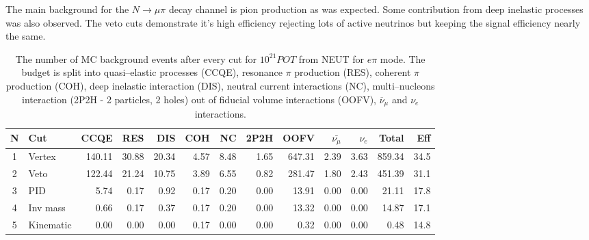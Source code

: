 \documentclass[../main.tex]{subfiles}
\begin{document}
The main background for the $N\to\mu\pi$ decay channel is pion production as was expected. Some contribution from deep inelastic processes was also observed. The veto cuts demonstrate it's high efficiency rejecting lots of active neutrinos but keeping the signal efficiency nearly the same.


\begin{table}[!ht]
\begin{tabular}{|c|l|r|r|r|r|r|r|r|r|r|r|r|}
  \hline
  N & Cut           &  CCQE   &  RES  &  DIS  &  COH  &  NC  &  2P2H  &  OOFV  &$\bar{\nu_{\mu}}$& $\nu_{e}$ & Total  & Eff\\
  \hline
  1 & Vertex        & 140.11  & 30.88 & 20.34 & 4.57  & 8.48 & 1.65   & 647.31 & 2.39            &  3.63     & 859.34 & 34.5 \\
  \hline
  2 & Veto          & 122.44  & 21.24 & 10.75 & 3.89  & 6.55 & 0.82   & 281.47 & 1.80            &  2.43     & 451.39 & 31.1 \\
  \hline
  3 & PID          & 5.74    & 0.17  & 0.92  & 0.17  & 0.20 & 0.00   & 13.91  & 0.00            &  0.00     &  21.11 & 17.8 \\
  \hline
  4 & Inv mass      & 0.66    & 0.17  & 0.37  & 0.17  & 0.20 & 0.00   & 13.32  & 0.00            &  0.00     &  14.87 & 17.1  \\
  \hline
  5 & Kinematic     & 0.00    & 0.00  & 0.00  & 0.17  & 0.00 & 0.00   & 0.32   & 0.00            &  0.00     &  0.48  & 14.8 \\
    \hline

\end{tabular}
\caption{The number of MC background events after every cut for $10^{21} POT$ from NEUT for $e\pi$ mode. The budget is split into quasi--elastic processes (CCQE), resonance $\pi$ production (RES), coherent $\pi$ production (COH), deep inelastic interaction (DIS), neutral current interactions (NC), multi--nucleons interaction (2P2H - 2 particles, 2 holes) out of fiducial volume interactions (OOFV), $\overline{\nu}_\mu$ and $\nu_e$ interactions.}
\label{tbl:HNL:bgOrigEle}
\end{table}
\end{document}
